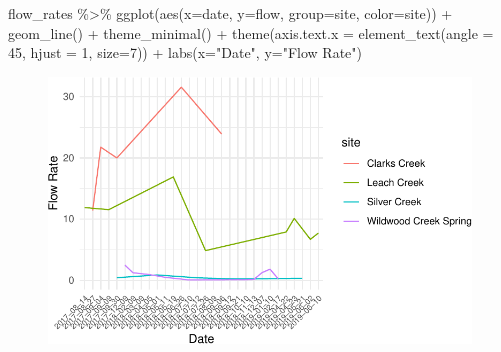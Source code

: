 \documentclass[
  letterpaper,
  DIV=11,
  numbers=noendperiod]{scrartcl}
\newenvironment{Shaded}{\begin{snugshade}}{\end{snugshade}}
\newcommand{\AttributeTok}[1]{\textcolor[rgb]{0.40,0.45,0.13}{#1}}
\newcommand{\DecValTok}[1]{\textcolor[rgb]{0.68,0.00,0.00}{#1}}
\newcommand{\FunctionTok}[1]{\textcolor[rgb]{0.28,0.35,0.67}{#1}}
\newcommand{\NormalTok}[1]{\textcolor[rgb]{0.00,0.23,0.31}{#1}}
\newcommand{\SpecialCharTok}[1]{\textcolor[rgb]{0.37,0.37,0.37}{#1}}
\newcommand{\StringTok}[1]{\textcolor[rgb]{0.13,0.47,0.30}{#1}}
\begin{document}
\begin{Shaded}
\begin{Highlighting}[]
\NormalTok{flow\_rates }\SpecialCharTok{\%\textgreater{}\%} 
  \FunctionTok{ggplot}\NormalTok{(}\FunctionTok{aes}\NormalTok{(}\AttributeTok{x=}\NormalTok{date, }\AttributeTok{y=}\NormalTok{flow, }\AttributeTok{group=}\NormalTok{site, }\AttributeTok{color=}\NormalTok{site)) }\SpecialCharTok{+} 
  \FunctionTok{geom\_line}\NormalTok{() }\SpecialCharTok{+} 
  \FunctionTok{theme\_minimal}\NormalTok{() }\SpecialCharTok{+}
  \FunctionTok{theme}\NormalTok{(}\AttributeTok{axis.text.x =} \FunctionTok{element\_text}\NormalTok{(}\AttributeTok{angle =} \DecValTok{45}\NormalTok{, }\AttributeTok{hjust =} \DecValTok{1}\NormalTok{, }\AttributeTok{size=}\DecValTok{7}\NormalTok{)) }\SpecialCharTok{+}
  \FunctionTok{labs}\NormalTok{(}\AttributeTok{x=}\StringTok{"Date"}\NormalTok{, }\AttributeTok{y=}\StringTok{"Flow Rate"}\NormalTok{)}
\end{Highlighting}
\end{Shaded}

\begin{figure}[H]

{\centering \includegraphics{118_F_ggplot2_files/figure-pdf/unnamed-chunk-9-1.pdf}

}

\end{figure}
\end{document}
